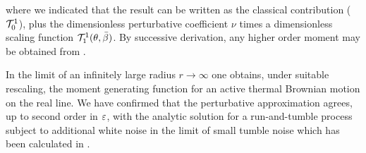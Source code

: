 \documentclass[%
 reprint,
superscriptaddress,
nofootinbib,
 amsmath,amssymb,
 aps,
prx,
]{revtex4-2}
\begin{document}
where we indicated that the result can be written as the classical contribution ($\mathcal{T}^1_0$), plus the dimensionless perturbative coefficient $\nu$ times a dimensionless scaling function $\mathcal{T}^1_1(\theta, \bar{\beta})$. By successive derivation, any higher order moment may be obtained from .

In the limit of an infinitely large radius $r \to \infty$ one obtains, under suitable rescaling, the moment generating function for an active thermal Brownian motion on the real line. 
We have confirmed that the perturbative approximation  agrees, up to second order in $\varepsilon$, with the analytic solution for a run-and-tumble process subject to additional white noise in the limit of small tumble noise which has been calculated in \cite{malakar_steady_2018}. 
\end{document}
